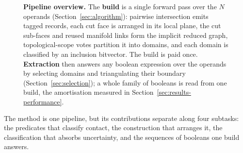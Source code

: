 \documentclass{egpubl}
\begin{document}
\begin{figure}[t]
  \centering
  
  \caption{\textbf{Pipeline overview.} The \textbf{build} is a single forward pass over the $N$ operands (Section~\ref{sec:algorithm}): pairwise intersection emits tagged records, each cut face is arranged in its local plane, the cut sub-faces and reused manifold links form the implicit reduced graph, topological-scope votes partition it into domains, and each domain is classified by an inclusion bitvector. The build is paid once. \textbf{Extraction} then answers any boolean expression over the operands by selecting domains and triangulating their boundary (Section~\ref{sec:selection}); a whole family of booleans is read from one build, the amortisation measured in Section~\ref{sec:results-performance}.}
  \label{fig:pipeline}
\end{figure}

The method is one pipeline, but its contributions separate along four subtasks: the predicates that classify contact, the construction that arranges it, the classification that absorbs uncertainty, and the sequences of booleans one build answers.
\end{document}

